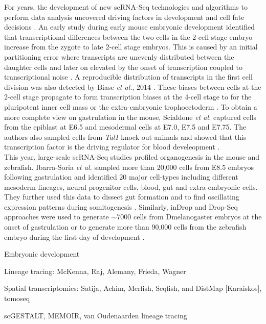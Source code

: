 For years, the development of new scRNA-Seq technologies and algorithms to perform data analysis uncovered driving factors in development and cell fate decisions \citep{Griffiths2018}. An early study during early mouse embryonic development identified that transcriptional differences between the two cells in the 2-cell stage embryo increase from the zygote to late 2-cell stage embryos. This is caused by an initial partitioning error where transcripts are unevenly distributed between the daughter cells and later on elevated by the onset of transcription coupled to transcriptional noise \citep{Piras2014, Shi2015a}. A reproducible distribution of transcripts in the first cell division was also detected by Biase \emph{et al.}, 2014 \cite{Biase2014}. These biases between cells at the 2-cell stage propagate to form transcription biases at the 4-cell stage to for the pluripotent inner cell mass or the extra-embryonic trophoectoderm \citep{Goolam2016, Shi2015a}. To obtain a more complete view on gastrulation in the mouse, Scialdone \emph{et al.} captured cells from the epiblast at E6.5 and mesodermal cells at E7.0, E7.5 and E7.75. The authors also sampled cells from \emph{Tal1} knock-out animals and showed that this transcription factor is the driving regulator for blood develeopment \citep{Scialdone2016}. \\

This year, large-scale scRNA-Seq studies profiled organogenesis in the mouse and zebrafish. Ibarra-Soria \emph{et al.} sampled more than 20,000 cells from E8.5 embryos following gastrulation and identified 20 major cell-types including different mesoderm lineages, neural progenitor cells, blood, gut and extra-embryonic cells. They further used this data to dissect gut formation and to find oscillating expression patterns during somitogenesis \citep{Ibarra-Soria2018}. Similarly, inDrop and Drop-Seq approaches were used to generate $\sim$7000 cells from \gls{Dmelanogaster} embryos at the onset of gastrulation or to generate more than 90,000 cells from the zebrafish embryo during the first day of development \citep{Wagner2018}.



Embryonic development

Lineage tracing: McKenna, Raj, Alemany, Frieda, Wagner

Spatial transcriptomics: Satija, Achim, Merfish, Seqfish, and DistMap [Karaiskos], tomoseq

scGESTALT, MEMOIR, van Oudenaarden lineage tracing

